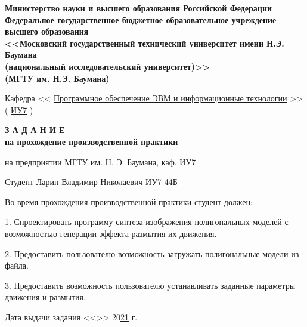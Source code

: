 \thispagestyle{empty}
\begin{center}
    \fontsize{11pt}{0.3\baselineskip}\selectfont \textbf{Министерство науки и высшего образования Российской Федерации \\ Федеральное государственное бюджетное образовательное учреждение \\ высшего образования \\ <<Московский государственный технический университет имени Н.Э. Баумана \\ (национальный исследовательский университет)>> \\ (МГТУ им. Н.Э. Баумана)}
    \makebox[\linewidth]{\rule{\textwidth}{3pt}}
    \makebox[\linewidth]{\rule{\textwidth}{3pt}}
    
    \vspace{\baselineskip}

    \fontsize{12pt}{\baselineskip}\selectfont 

    Кафедра << \uline{Программное обеспечение ЭВМ и информационные технологии} >> ( \uline{ИУ7} )
\end{center}


\begin{center}
    \fontsize{18pt}{\baselineskip}\selectfont \textbf{З А Д А Н И Е}\\
    \fontsize{16pt}{\baselineskip}\selectfont \textbf{на прохождение производственной практики}
\end{center}

\normalsize

\begingroup
\fontsize{12pt}{1\baselineskip}\selectfont
\setlength{\parindent}{0em}
на предприятии \uline{\hfill МГТУ им. Н. Э. Баумана, каф. ИУ7 \hfill}

Студент \uline{\hfill Ларин Владимир Николаевич ИУ7-44Б \hfill}

Во время прохождения производственной практики студент должен:

1. Спроектировать программу синтеза изображения полигональных моделей с возможностью генерации эффекта размытия их движения.  

2. Предоставить пользователю возможность загружать полигональные модели из файла. 

3. Предоставить возможность пользователю устанавливать заданные параметры движения и размытия.


\vfill

Дата выдачи задания
 <<\uline{\mbox{\hspace*{5mm}}}>> \uline{\mbox{\hspace*{2.5cm}}} 20\uline{21} г.

